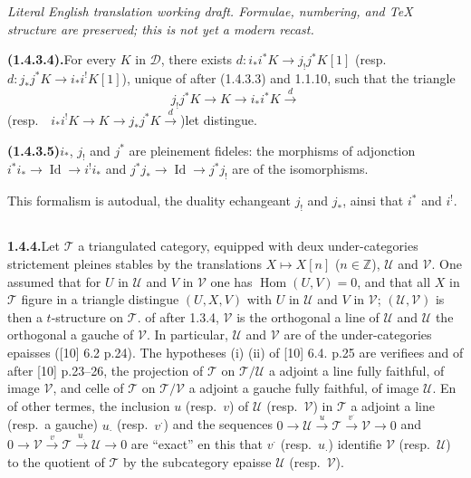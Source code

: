 \documentclass[12pt,a4paper]{article}
\theoremstyle{plain}
\theoremstyle{definition}
\DeclareMathOperator{\Hom}{Hom}
\DeclareMathOperator{\Id}{Id}
\begin{document}
\begin{center}\small\emph{Literal English translation working draft. Formulae, numbering, and TeX structure are preserved; this is not yet a modern recast.}\end{center}
\vspace{0.5em}

\pagestyle{myheadings}

\noindent\textbf{(1.4.3.4).}\quad For every $K$ in $\mathcal{D}$, there exists $d : i_*i^*K \to j_!j^*K[1]$ (resp.\ $d : j_*j^*K \to i_*i^!K[1]$), unique of after (1.4.3.3) and 1.1.10, such that the triangle
\[
j_!j^*K \to K \to i_*i^*K \xrightarrow{d}
\]
(resp.\ \ $i_*i^!K \to K \to j_*j^*K \xrightarrow{d}$)\quad let distingue.

\smallskip
\noindent\textbf{(1.4.3.5)}\quad $i_*$, $j_!$ and $j^*$ are pleinement fideles: the morphisms of adjonction $i^*i_* \to \Id \to i^!i_*$ and $j^*j_* \to \Id \to j^*j_!$ are of the isomorphisms.

This formalism is autodual, the duality echangeant $j_!$ and $j_*$, ainsi that $i^*$ and $i^!$.

\subsection{}
\noindent\textbf{1.4.4.}\quad Let $\mathcal{T}$ a triangulated category, equipped with deux under-categories strictement pleines stables by the translations $X \mapsto X[n]$ ($n \in \mathbb{Z}$), $\mathcal{U}$ and $\mathcal{V}$. One assumed that for $U$ in $\mathcal{U}$ and $V$ in $\mathcal{V}$ one has $\Hom(U,V) = 0$, and that all $X$ in $\mathcal{T}$ figure in a triangle distingue $(U,X,V)$ with $U$ in $\mathcal{U}$ and $V$ in $\mathcal{V}$; $(\mathcal{U},\mathcal{V})$ is then a $t$-structure on $\mathcal{T}$. of after 1.3.4, $\mathcal{V}$ is the orthogonal a line of $\mathcal{U}$ and $\mathcal{U}$ the orthogonal a gauche of $\mathcal{V}$. In particular, $\mathcal{U}$ and $\mathcal{V}$ are of the under-categories epaisses ([10] 6.2 p.24). The hypotheses (i) (ii) of [10] 6.4. p.25 are verifiees and of after [10] p.23--26, the projection of $\mathcal{T}$ on $\mathcal{T}/\mathcal{U}$ a adjoint a line fully faithful, of image $\mathcal{V}$, and celle of $\mathcal{T}$ on $\mathcal{T}/\mathcal{V}$ a adjoint a gauche fully faithful, of image $\mathcal{U}$. En of other termes, the inclusion $u$ (resp.\ $v$) of $\mathcal{U}$ (resp.\ $\mathcal{V}$) in $\mathcal{T}$ a adjoint a line (resp.\ a gauche) $u_\cdot$ (resp.\ $v^\cdot$) and the sequences $0 \longrightarrow \mathcal{U} \xrightarrow{u} \mathcal{T} \xrightarrow{v^\cdot} \mathcal{V} \longrightarrow 0$ and $0 \longrightarrow \mathcal{V} \xrightarrow{v} \mathcal{T} \xrightarrow{u_\cdot} \mathcal{U} \longrightarrow 0$ are ``exact'' en this that $v^\cdot$ (resp.\ $u_\cdot$) identifie $\mathcal{V}$ (resp.\ $\mathcal{U}$) to the quotient of $\mathcal{T}$ by the subcategory epaisse $\mathcal{U}$ (resp.\ $\mathcal{V}$).
\end{document}
